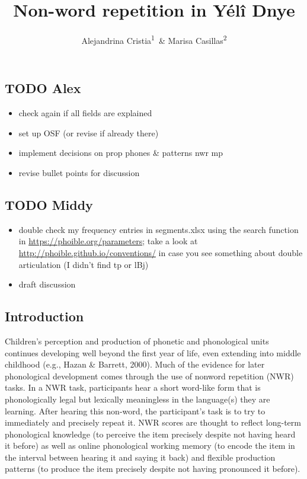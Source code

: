 \documentclass[english,,man,floatsintext]{apa6}
\title{Non-word repetition in Yélî Dnye}
\author{Alejandrina Cristia\textsuperscript{1}~\& Marisa
Casillas\textsuperscript{2}}
\date{}
\providecommand{\tightlist}{%
  \setlength{\itemsep}{0pt}\setlength{\parskip}{0pt}}
\begin{document}
\maketitle

\subsection{TODO Alex}\label{todo-alex}

\begin{itemize}
\tightlist
\item
  check again if all fields are explained
\item
  set up OSF (or revise if already there)
\item
  implement decisions on prop phones \& patterns nwr mp
\item
  revise bullet points for discussion
\end{itemize}

\subsection{TODO Middy}\label{todo-middy}

\begin{itemize}
\tightlist
\item
  double check my frequency entries in segments.xlsx using the search
  function in \url{https://phoible.org/parameters}; take a look at
  \url{http://phoible.github.io/conventions/} in case you see something
  about double articulation (I didn't find tp or lBj) 
\item
  draft discussion
\end{itemize}

\subsection{Introduction}\label{introduction}

Children's perception and production of phonetic and phonological units
continues developing well beyond the first year of life, even extending
into middle childhood (e.g., Hazan \& Barrett, 2000). Much of the
evidence for later phonological development comes through the use of
nonword repetition (NWR) tasks. In a NWR task, participants hear a short
word-like form that is phonologically legal but lexically meaningless in
the language(s) they are learning. After hearing this non-word, the
participant's task is to try to immediately and precisely repeat it. NWR
scores are thought to reflect long-term phonological knowledge (to
perceive the item precisely despite not having heard it before) as well
as online phonological working memory (to encode the item in the
interval between hearing it and saying it back) and flexible production
patterns (to produce the item precisely despite not having pronounced it
before).
\end{document}
